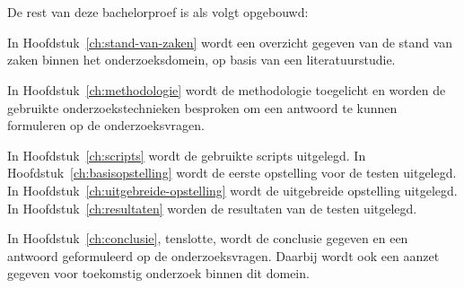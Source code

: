 \section{}%
\label{sec:opzet-bachelorproef}


De rest van deze bachelorproef is als volgt opgebouwd:

In Hoofdstuk~\ref{ch:stand-van-zaken} wordt een overzicht gegeven van de stand van zaken binnen het onderzoeksdomein, op basis van een literatuurstudie.

In Hoofdstuk~\ref{ch:methodologie} wordt de methodologie toegelicht en worden de gebruikte onderzoekstechnieken besproken om een antwoord te kunnen formuleren op de onderzoeksvragen.


In Hoofdstuk~\ref{ch:scripts} wordt de gebruikte scripts uitgelegd.
In Hoofdstuk~\ref{ch:basisopstelling} wordt de eerste opstelling voor de testen uitgelegd.
In Hoofdstuk~\ref{ch:uitgebreide-opstelling} wordt de uitgebreide opstelling uitgelegd.
In Hoofdstuk~\ref{ch:resultaten} worden de resultaten van de testen uitgelegd.

In Hoofdstuk~\ref{ch:conclusie}, tenslotte, wordt de conclusie gegeven en een antwoord geformuleerd op de onderzoeksvragen. Daarbij wordt ook een aanzet gegeven voor toekomstig onderzoek binnen dit domein.